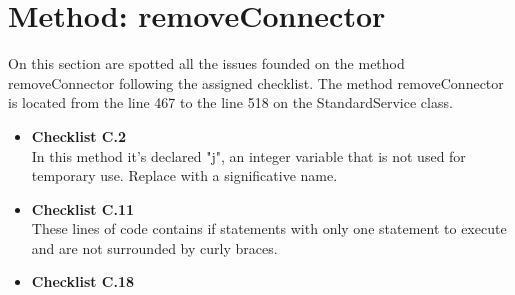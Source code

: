 \documentclass[../../../../codeInspection.tex]{subfiles}
\begin{document}
	\section{Method: removeConnector}

		On this section are spotted all the issues founded on the method removeConnector following the assigned checklist.
		The method removeConnector is located from the line 467 to the line 518 on the StandardService class.

		\begin{itemize}

			\item \textbf{Checklist C.2} \\

				  In this method it's declared "j", an integer variable that is not used for temporary use. Replace with a significative name.

			\item \textbf{Checklist C.11} \\

				  

				  

				  These lines of code contains if statements with only one statement to execute and are not surrounded by curly braces.

		    \item \textbf{Checklist C.18} \\

		    	  

		    	  

		    	  

		    	  

		    	  

		    	  


\end{itemize}
\end{document}
